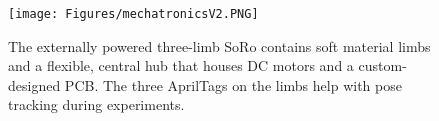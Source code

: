 \begin{figure}[!h]
    \centering
    \texttt{[image: Figures/mechatronicsV2.PNG]}
    \caption{The externally powered three-limb SoRo contains soft material limbs and a flexible, central hub that houses DC motors and a custom-designed PCB. The three AprilTags on the limbs help with pose tracking during experiments.}
    \label{fig:mech}
\end{figure}




